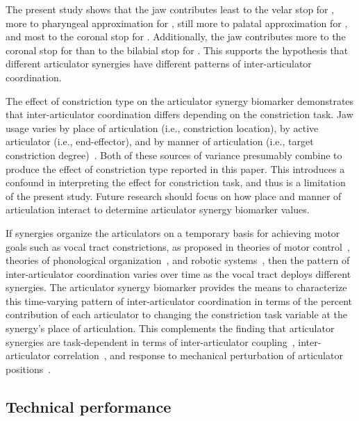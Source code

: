 \documentclass[preprint]{JASAnew}\usepackage[]{graphicx}\usepackage[]{color}
\begin{document}
The present study shows that the jaw contributes 
least to the velar stop for \textipa{[k]},
more to pharyngeal approximation for \textipa{[A]}, 
still more to palatal approximation for \textipa{[i]},
and most to the coronal stop for \textipa{[t]}.
Additionally, the jaw contributes more to the coronal stop for \textipa{[t]} than to the bilabial stop for \textipa{[p]}.
%
This supports the hypothesis that different articulator synergies have different patterns of inter-articulator coordination.


The effect of constriction type on the articulator synergy biomarker demonstrates that inter-articulator coordination differs depending on the constriction task. Jaw usage varies by place of articulation (i.e., constriction location), by active articulator (i.e., end-effector), and by manner of articulation (i.e., target constriction degree)~\cite{vatikiotis1995analysis}. Both of these sources of variance presumably combine to produce the effect of constriction type reported in this paper. This introduces a confound in interpreting the effect for constriction task, and thus is a limitation of the present study. Future research should focus on how place and manner of articulation interact to determine articulator synergy biomarker values.


If synergies organize the articulators on a temporary basis for achieving motor goals such as vocal tract constrictions, as proposed in theories of motor control~\citep{turvey1977preliminaries, saltzman1987skilled}, theories of phonological organization~\citep{browman1986towards, browman1989articulatory}, and robotic systems~\citep{herbort2010sure}, then the pattern of inter-articulator coordination varies over time as the vocal tract deploys different synergies. 
%
The articulator synergy biomarker provides the means to characterize this time-varying pattern of inter-articulator coordination in terms of the percent contribution of each articulator to changing the constriction task variable at the synergy's place of articulation. 
%
This complements the finding that articulator synergies are task-dependent in terms of inter-articulator coupling~\citep{lancia2018coupling}, inter-articulator correlation~\citep{jackson2009statistical}, and response to mechanical perturbation of articulator positions~\citep{kelso1984functionally}.


\subsection{Technical performance}
\end{document}
